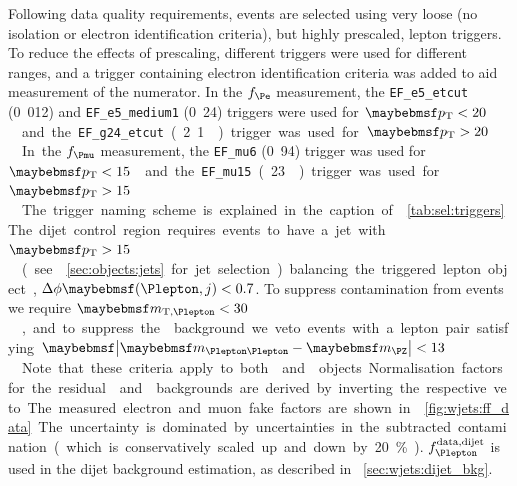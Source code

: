 Following data quality requirements, events are selected using very loose (no isolation 
or electron identification criteria), but highly prescaled, lepton triggers. To reduce 
the effects of prescaling, different triggers were used for different \pt ranges, and a 
trigger containing electron identification criteria was added to aid measurement of the 
numerator. 
In the $f_{\Pe}$ measurement, the \verb|EF_e5_etcut| (\unit{0.012}{\invpb}) and 
\verb|EF_e5_medium1| (\unit{0.24}{\invpb}) triggers were used for \unit{$\pt < 20$}{\GeV} 
and the \verb|EF_g24_etcut| (\unit{2.1}{\invpb}) trigger was used for 
\unit{$\pt > 20$}{\GeV}. 
In the $f_{\Pmu}$ measurement, the \verb|EF_mu6| (\unit{0.94}{\invpb}) trigger was used 
for \unit{$\pt < 15$}{\GeV} and the \verb|EF_mu15| (\unit{23}{\invpb}) trigger was used 
for \unit{$\pt > 15$}{\GeV}. The trigger naming scheme is explained in the caption of 
\Table~\ref{tab:sel:triggers}.

The dijet control region requires events to have a jet with \unit{$\pt > 15$}{\GeV} (see 
\Section~\ref{sec:objects:jets} for jet selection) balancing the triggered lepton object,
$\Delta\phi\parenths{\Plepton,j} < 0.7$. To suppress contamination from \PW events we 
require \unit{$\mtw < 30$}{\GeV}, and to suppress the \PZ background we veto events with 
a lepton pair satisfying \unit{$\mods{\mll - \mZ} < 13$}{\GeV}. Note that these 
criteria apply to both \id{\Plepton} and \antiid{\Plepton} objects. Normalisation factors 
for the residual \PW and \PZ backgrounds are derived by inverting the respective veto.

The measured electron and muon fake factors are shown in \Figure~\ref{fig:wjets:ff_data}. 
The uncertainty is dominated by uncertainties in the subtracted contamination (which is 
conservatively scaled up and down by 20\%). $f_{\Plepton}^{\text{data,dijet}}$ is used in 
the dijet background estimation, as described in \Section~\ref{sec:wjets:dijet_bkg}.

